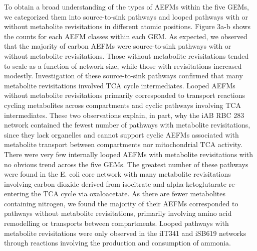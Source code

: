 \documentclass[12pt]{article}
\begin{document}
To obtain a broad understanding of the types of AEFMs within the five
GEMs, we categorized them into source-to-sink pathways and looped pathways
with or without metabolite revisitations in different atomic positions.
Figure 3a-b shows the counts for each AEFM classes within each GEM. As
expected, we observed that the majority of carbon AEFMs were
source-to-sink pathways with or without metabolite revisitations. Those
without metabolite revisitations tended to scale as a function of network
size, while those with revisitations increased modestly. Investigation of
these source-to-sink pathways confirmed that many metabolite revisitations
involved TCA cycle intermediates. Looped AEFMs without metabolite
revisitations primarily corresponded to transport reactions cycling
metabolites across compartments and cyclic pathways involving TCA
intermediates. These two observations explain, in part, why the iAB RBC 283
network contained the fewest number of pathways with metabolite
revisitations, since they lack organelles and cannot support cyclic AEFMs
associated with metabolite transport between compartments nor
mitochondrial TCA activity. There were very few internally looped AEFMs
with metabolite revisitations with no obvious trend across the five GEMs.
The greatest number of these pathways were found in the E. coli core
network with many metabolite revisitations involving carbon dioxide
derived from isocitrate and alpha-ketoglutarate re-entering the TCA cycle
via oxaloacetate. As there are fewer metabolites containing nitrogen, we
found the majority of their AEFMs corresponded to pathways without
metabolite revisitations, primarily involving amino acid remodelling or
transports between compartments. Looped pathways with metabolite
revisitations were only observed in the iIT341 and iSB619 networks through
reactions involving the production and consumption of ammonia. 
\end{document}
